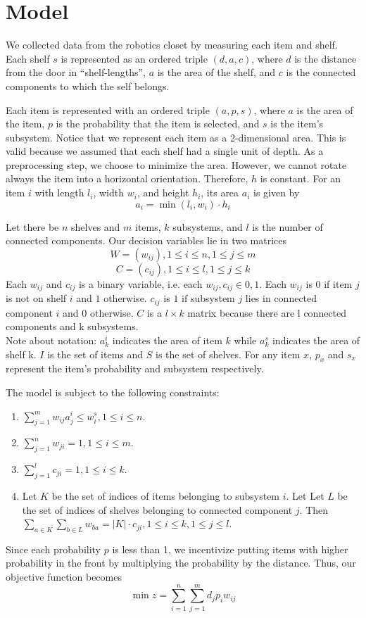 \documentclass[10pt]{article}
\theoremstyle{named}
\begin{document}
\section{Model}
We collected data from the robotics closet by measuring each item and shelf. Each
shelf $s$ is represented as an ordered triple $(d, a, c)$, where $d$ is the
distance from the door in ``shelf-lengths'', $a$ is the area of the shelf, and
$c$ is the connected components to which the self belongs.
\par
Each item is represented with an ordered triple $(a, p, s)$, where $a$ is the area
of the item, $p$ is the probability that the item is selected, and $s$ is the item's
subsystem. Notice that we represent each item as a 2-dimensional area. This is valid
because we assumed that each shelf had a single unit of depth. As a preprocessing step,
we choose to minimize the area. However, we cannot rotate always the item into a
horizontal orientation. Therefore, $h$ is constant. For an item $i$ with length $l_i$,
width $w_i$, and height $h_i$, its area $a_i$ is given by 
$$a_i = \min(l_i, w_i) \cdot h_i$$
\par
Let there be $n$ shelves and $m$ items, $k$ subsystems, and $l$ is the number of
connected components. Our decision variables lie in two matrices
$$W = (w_{ij}), 1 \leq i \leq n, 1 \leq j \leq m$$
$$C = (c_{ij}), 1 \leq i \leq l, 1 \leq j \leq k$$
Each $w_{ij}$ and $c_{ij}$ is a binary variable, i.e. each $w_{ij}, c_{ij} \in {0, 1}$.
Each $w_{ij}$ is $0$ if item $j$ is not on shelf $i$ and $1$ otherwise. $c_{ij}$ is
$1$ if subsystem $j$ lies in connected component $i$ and $0$ otherwise. 
$C$ is a $l \times k$ matrix because there are l connected components and k subsystems. \\
Note about notation: $a^i_k$ indicates the area of item $k$ while $a^s_k$ indicates the
area of shelf k. $I$ is the set of items and $S$ is the set of shelves. For any item
$x$, $p_x$ and $s_x$ represent the item's probability and subsystem respectively. 
\par
The model is subject to the following constraints:
\begin{enumerate}
\item $\sum_{j = 1}^{m}w_{ij}a^i_j \leq w^s_i, 1 \leq i \leq n$.
\item $\sum_{j = 1}^{n}w_{ji} = 1, 1 \leq i \leq m$.
\item $\sum_{j = 1}^{l}c_{ji} = 1, 1 \leq i \leq k$.
\item Let $K$ be the set of indices of items belonging to subsystem $i$. Let
  Let $L$ be the set of indices of shelves belonging to connected component $j$.
  Then $\sum_{a \in K}\sum_{b \in L}w_{ba} = |K| \cdot c_{ji}, 1 \leq i \leq k, 1 \leq j \leq l$.
\end{enumerate}
Since each probability $p$ is less than 1, we incentivize putting items with higher probability
in the front by multiplying the probability by the distance. Thus, our objective function
becomes
$$\min z = \sum_{i = 1}^{n}\sum_{j = 1}^{m} d_j p_i w_{ij}$$
\end{document}
